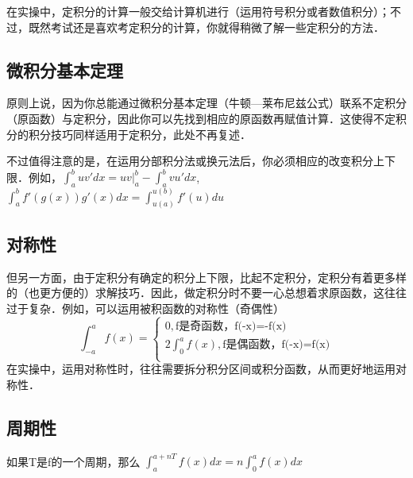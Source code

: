 
在实操中，定积分的计算一般交给计算机进行（运用符号积分或者数值积分）；不过，既然考试还是喜欢考定积分的计算，你就得稍微了解一些定积分的方法．

\subsection{微积分基本定理}
原则上说，因为你总能通过微积分基本定理（牛顿—莱布尼兹公式）联系不定积分（原函数）与定积分，因此你可以先找到相应的原函数再赋值计算．这使得不定积分的积分技巧同样适用于定积分，此处不再复述．

不过值得注意的是，在运用分部积分法或换元法后，你必须相应的改变积分上下限．例如，$\int^b_a uv'dx = uv|^b_a-\int^b_a vu'dx$, $\int^b_a f'(g(x))g'(x)dx = \int ^{u(b)}_{u(a)} f'(u)du$

\subsection{对称性}
但另一方面，由于定积分有确定的积分上下限，比起不定积分，定积分有着更多样的（也更方便的）求解技巧．因此，做定积分时不要一心总想着求原函数，这往往过于复杂．例如，可以运用被积函数的对称性（奇偶性）
$$
\int ^a_{-a} f(x) = 
\left \{
\begin{aligned}
0,\text{f是奇函数，f(-x)=-f(x)}\\
2\int ^a_0 f(x),\text{f是偶函数，f(-x)=f(x)}\\
\end{aligned}
\right.
$$
在实操中，运用对称性时，往往需要拆分积分区间或积分函数，从而更好地运用对称性．

\subsection{周期性}
如果T是f的一个周期，那么 $\int ^{a+nT}_{a} f(x)dx= n\int^{a}_0 f(x)dx$